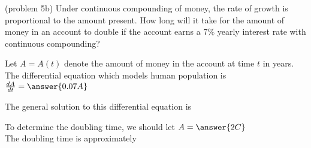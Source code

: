 \documentclass{ximera}
\begin{document}
\begin{problem}(problem 5b)
Under continuous compounding of money, the rate of growth is proportional to the amount present.
How long will it take for the amount of money in an account to double if the account earns a $7\%$ yearly interest rate with continuous compounding?



Let $A= A(t)$ denote the amount of money in the account at time  $t$  in years.\\
The differential equation which models human population is\\

$\frac{dA}{dt} = \answer{0.07A}$

The general solution to this differential equation is 

\begin{multipleChoice}
\end{multipleChoice}

To determine the doubling time, we should let $A = \answer{2C}$\\

The doubling time is approximately

\begin{multipleChoice}
\end{multipleChoice}

\end{problem}
\end{document}
